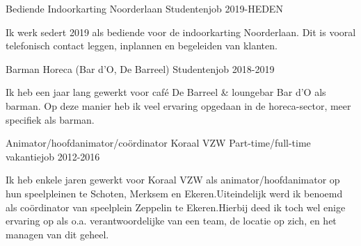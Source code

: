 
    \begin{cventries}
    
        \cventry
            {Bediende} %
            {Indoorkarting Noorderlaan} %
            {Studentenjob} %
            {2019-HEDEN} %
            {
                \begin{cvitems} %
                    \item
                    {
                        Ik werk sedert 2019 als bediende voor de indoorkarting Noorderlaan. Dit is vooral telefonisch contact leggen, inplannen en begeleiden van klanten.
                    }
                \end{cvitems}
            }
        
        \cventry
            {Barman} %
            {Horeca (Bar d'O, De Barreel)} %
            {Studentenjob} %
            {2018-2019} %
            {
                \begin{cvitems} %
                    \item
                    {
                        Ik heb een jaar lang gewerkt voor café De Barreel \& loungebar Bar d'O als barman. Op deze manier heb ik veel ervaring opgedaan in de horeca-sector, meer specifiek als barman.
                    }
                \end{cvitems}
            }
        
        \cventry
            {Animator/hoofdanimator/coördinator} %
            {Koraal VZW} %
            {Part-time/full-time vakantiejob} %
            {2012-2016} %
            {
                \begin{cvitems} %
                    \item
                    {
                        Ik heb enkele jaren gewerkt voor Koraal VZW als animator/hoofdanimator op hun speelpleinen te Schoten, Merksem en Ekeren.\newline Uiteindelijk werd ik benoemd als coördinator van speelplein Zeppelin te Ekeren.\newline Hierbij deed ik toch wel enige ervaring op als o.a. verantwoordelijke van een team, de locatie op zich, en het managen van dit geheel.
                    }
                \end{cvitems}
            }
        
    \end{cventries}
